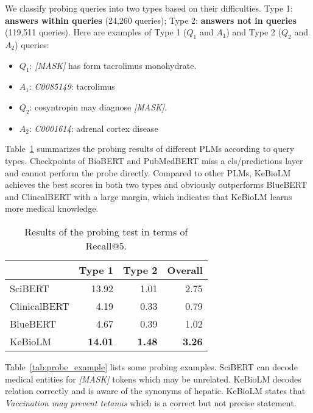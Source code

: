 \documentclass[11pt]{article}
\begin{document}
We classify probing queries into two types based on their difficulties.
Type 1: \textbf{answers within queries} (24,260 queries);
Type 2: \textbf{answers not in queries} (119,511 queries).
Here are examples of Type 1 ($Q_1$ and $A_1$) and Type 2 ($Q_2$ and $A_2$) queries:
\begin{itemize}
    \item $Q_1$: \textit{[MASK]} has form tacrolimus monohydrate.
    \item $A_1$: \textit{C0085149}: tacrolimus
    \item $Q_2$: cosyntropin may diagnose \textit{[MASK]}.
    \item $A_2$: \textit{C0001614}: adrenal cortex disease
\end{itemize}



Table~\ref{tab:probe} summarizes the probing results of different PLMs according to query types.
Checkpoints of BioBERT and PubMedBERT miss a cls/predictions layer and cannot perform the probe directly.
Compared to other PLMs, KeBioLM achieves the best scores in both two types and obviously outperforms BlueBERT and ClincalBERT with a large margin, which indicates that KeBioLM learns more medical knowledge.


\begin{table}
\centering
\begin{tabular}{lrrr}
\hline
&Type 1&Type 2&Overall\\
\hline
SciBERT&13.92&1.01&2.75\\
ClinicalBERT&4.19&0.33&0.79\\
BlueBERT&4.67&0.39&1.02\\
\hline
KeBioLM&\textbf{14.01}&\textbf{1.48}&\textbf{3.26}\\
\hline
\end{tabular}
\caption{Results of the probing test in terms of Recall@5.}
\label{tab:probe}
\end{table}

Table~\ref{tab:probe_example} lists some probing examples.
SciBERT can decode medical entities for \textit{[MASK]} tokens which may be unrelated.
KeBioLM decodes relation correctly and is aware of the synonyms of hepatic.
KeBioLM states that \textit{Vaccination may prevent tetanus} which is a correct but not precise statement.
\end{document}
